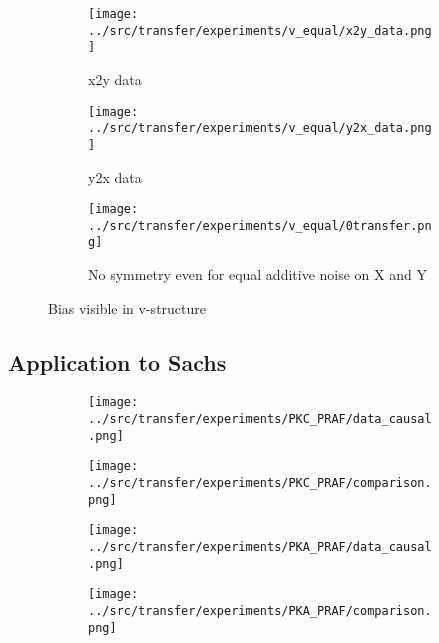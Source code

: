 \documentclass{article}
\begin{document}
\begin{figure}[H]
    \centering
    \begin{subfigure}{.49\linewidth}
        \centering
        \texttt{[image: ../src/transfer/experiments/v\_equal/x2y\_data.png]}
        \caption{x2y data}
    \end{subfigure}
    \begin{subfigure}{.49\linewidth}
        \centering
        \texttt{[image: ../src/transfer/experiments/v\_equal/y2x\_data.png]}
        \caption{y2x data}
    \end{subfigure}
    \hfill
    \begin{subfigure}{\linewidth}
        \centering
        \texttt{[image: ../src/transfer/experiments/v\_equal/0transfer.png]}
        \caption{No symmetry even for equal additive noise on X and Y}
    \end{subfigure}
    \hfill
    \caption{Bias visible in v-structure}
\end{figure}

\clearpage
\subsection{Application to Sachs}

\begin{figure}[H]
    \centering
    \begin{subfigure}{.49\linewidth}
        \centering
        \texttt{[image: ../src/transfer/experiments/PKC\_PRAF/data\_causal.png]}
    \end{subfigure}
    \begin{subfigure}{.49\linewidth}
        \centering
        \texttt{[image: ../src/transfer/experiments/PKC\_PRAF/comparison.png]}
    \end{subfigure}
    \hfill
    \begin{subfigure}{.49\linewidth}
        \centering
        \texttt{[image: ../src/transfer/experiments/PKA\_PRAF/data\_causal.png]}
    \end{subfigure}
    \begin{subfigure}{.49\linewidth}
        \centering
        \texttt{[image: ../src/transfer/experiments/PKA\_PRAF/comparison.png]}
    \end{subfigure}
\end{figure}


\clearpage
\printbibliography
\end{document}

